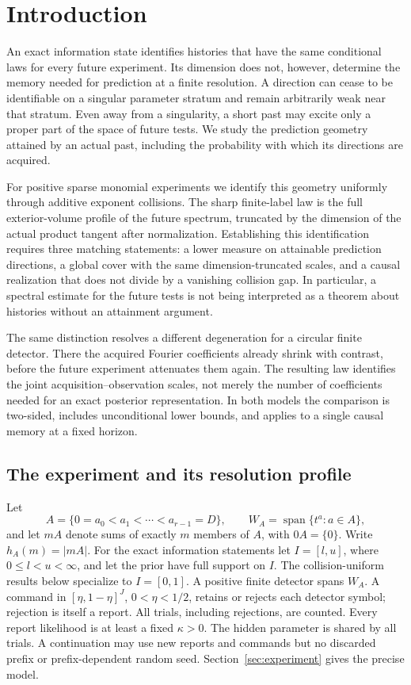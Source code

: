 \section{Introduction}
An exact information state identifies histories that have the same
conditional laws for every future experiment. Its dimension does not,
however, determine the memory needed for prediction at a finite
resolution. A direction can cease to be identifiable on a singular
parameter stratum and remain arbitrarily weak near that stratum. Even
away from a singularity, a short past may excite only a proper part of
the space of future tests. We study the prediction geometry attained
by an actual past, including the probability with which its directions
are acquired.

For positive sparse monomial experiments we identify this geometry
uniformly through additive exponent collisions. The sharp finite-label
law is the full exterior-volume profile of the future spectrum,
truncated by the dimension of the actual product tangent after
normalization. Establishing this identification requires three matching
statements: a lower measure on attainable prediction directions, a
global cover with the same dimension-truncated scales, and a causal
realization that does not divide by a vanishing collision gap. In
particular, a spectral estimate for the future tests is not being
interpreted as a theorem about histories without an attainment argument.

The same distinction resolves a different degeneration for a circular
finite detector. There the acquired Fourier coefficients already shrink
with contrast, before the future experiment attenuates them again.
The resulting law identifies the joint acquisition--observation scales,
not merely the number of coefficients needed for an exact posterior
representation. In both models the comparison is two-sided, includes
unconditional lower bounds, and applies to a single causal memory at a
fixed horizon.

\subsection{The experiment and its resolution profile}
Let
\[
 A=\{0=a_0<a_1<\cdots<a_{r-1}=D\},\qquad
 W_A=\operatorname{span}\{t^a:a\in A\},
\]
and let $mA$ denote sums of exactly $m$ members of $A$, with $0A=\{0\}$.
Write $h_A(m)=|mA|$. For the exact information statements let
$I=[l,u]$, where $0\le l<u<\infty$, and let the prior have full support
on $I$. The collision-uniform results below specialize to $I=[0,1]$.
A positive finite detector spans $W_A$. A command in
$[\eta,1-\eta]^J$, $0<\eta<1/2$, retains or rejects each detector
symbol; rejection is itself a report. All trials, including rejections,
are counted. Every report likelihood is at least a fixed $\kappa>0$.
The hidden parameter is shared by all trials. A continuation may use
new reports and commands but no discarded prefix or prefix-dependent
random seed. Section~\ref{sec:experiment} gives the precise model.

